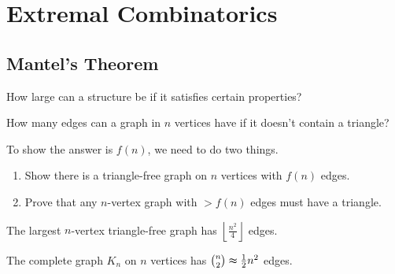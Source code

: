 \chapter{Extremal Combinatorics}


\section{Mantel's Theorem}\label{sec:mantel}

\begin{question}
    How large can a structure be if it satisfies certain properties?
\end{question}

\begin{eg}[Mantel, 1907]
    How many edges can a graph in \(n\) vertices have if it doesn't contain a triangle?
\end{eg}

To show the answer is \(f(n)\), we need to do two things. 
\begin{enumerate}[(1)]
    \item Show there is a triangle-free graph on \(n\) vertices with \(f(n)\) edges. 
    \item Prove that any \(n\)-vertex graph with \(> f(n)\) edges must have a triangle.    
\end{enumerate} 

\begin{theorem}[Mantel, 1907]\label{thm:mantel}
    The largest \(n\)-vertex triangle-free graph has \(\left\lfloor \frac{n^2}{4} \right\rfloor\) edges.  
\end{theorem}

\begin{remark}
    The complete graph \(K_n\) on \(n\) vertices has \(\binom{n}{2} \thickapprox \frac{1}{2} n^2\) edges.   
\end{remark}

